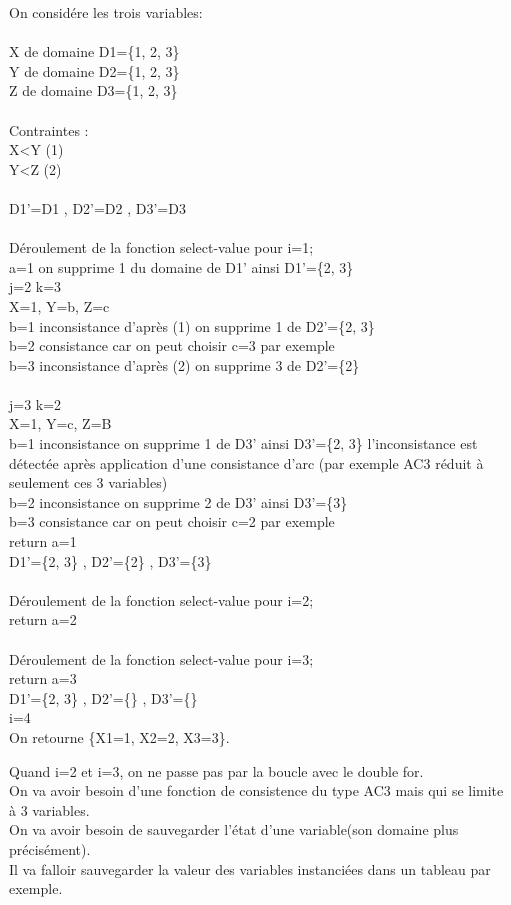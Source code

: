 On considére les trois variables:\\
\\
X de domaine D1=\{1, 2, 3\}\\
Y de domaine D2=\{1, 2, 3\}\\
Z de domaine D3=\{1, 2, 3\}\\
\\
Contraintes :\\
X<Y (1)\\
Y<Z (2)\\
\\
D1’=D1 , D2’=D2 , D3’=D3\\
\\
Déroulement de la fonction select-value pour i=1;\\
a=1 on supprime 1 du domaine de D1’ ainsi D1’=\{2, 3\}\\
j=2 k=3\\
X=1, Y=b, Z=c\\
b=1 inconsistance d’après (1) on supprime 1 de D2’=\{2, 3\}\\
b=2 consistance car on peut choisir c=3 par exemple\\
b=3 inconsistance d’après (2) on supprime 3 de D2’=\{2\}\\
\\
j=3 k=2\\
X=1, Y=c, Z=B\\
b=1 inconsistance on supprime 1 de D3’ ainsi D3’=\{2, 3\} l'inconsistance est détectée après application d'une consistance d'arc (par exemple AC3 réduit à seulement ces 3 variables)\\
b=2 inconsistance on supprime 2 de D3’ ainsi D3’=\{3\} \\
b=3 consistance car on peut choisir c=2 par exemple\\
return a=1\\
D1’=\{2, 3\} , D2’=\{2\} , D3’=\{3\}\\
\\
Déroulement de la fonction select-value pour i=2;\\
return a=2\\
\\
Déroulement de la fonction select-value pour i=3;\\
return a=3\\
D1’=\{2, 3\} , D2’=\{\} , D3’=\{\}\\
i=4\\
On retourne \{X1=1, X2=2, X3=3\}.

Quand i=2 et i=3, on ne passe pas par la boucle avec le double for.\\
On va avoir besoin d'une fonction de consistence du type AC3 mais qui se limite à 3 variables.\\
On va avoir besoin de sauvegarder l'état d'une variable(son domaine plus précisément).\\
Il va falloir sauvegarder la valeur des variables instanciées dans un tableau par exemple.
